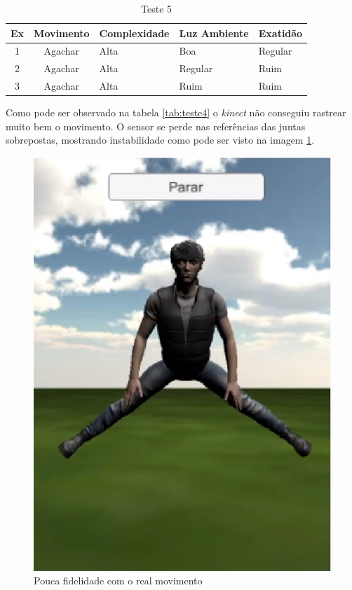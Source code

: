 \begin{table}[H]
\centering
\caption{Teste 5}
\label{tab:teste5}
\begin{tabular}{@{}|c|c|l|l|l|@{}}
\toprule
\multicolumn{1}{|l|}{\textbf{Ex}} & \multicolumn{1}{l|}{\textbf{Movimento}} & \textbf{Complexidade} & \textbf{Luz Ambiente} & \textbf{Exatidão} \\ \midrule
1                                 & Agachar                     & Alta                 & Boa                   & Regular               \\ \midrule
2                                 & Agachar                     & Alta                 & Regular               & Ruim           \\ \midrule
3                                 & Agachar                     & Alta                 & Ruim                  & Ruim              \\ \bottomrule
\end{tabular}
\end{table}

Como pode ser observado na tabela \ref{tab:teste4} o \textit{kinect} não conseguiu rastrear muito bem o movimento. O sensor se perde nas referências das juntas
sobrepostas, mostrando instabilidade como pode ser visto na imagem \ref{img:teste5}.

\begin{figure}[H]
\centering
\includegraphics [keepaspectratio=true,scale=0.60]{figuras/agachar.eps}
\caption{Pouca fidelidade com o real movimento}
\label{img:teste5}
\end{figure}


